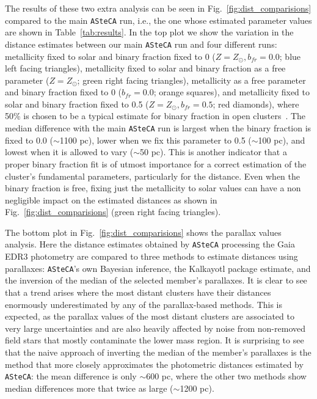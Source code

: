 \documentclass[draft]{aa}
\begin{document}
  The results of these two extra analysis can be seen in
  Fig.~\ref{fig:dist_comparisions} compared to the main \texttt{ASteCA} run,
  i.e., the one whose estimated parameter values are shown in
  Table~\ref{tab:results}.
  In the top plot we show the variation in the distance estimates between our
  main \texttt{ASteCA} run and four different runs: metallicity fixed to solar
  and binary fraction fixed to 0 ($Z=Z_{\odot},b_{fr}=0.0$; blue left
  facing triangles), metallicity fixed to solar and binary fraction as a free
  parameter ($Z=Z_{\odot}$; green right facing triangles), metallicity
  as a free parameter and binary fraction fixed to 0 ($b_{fr}=0.0$; orange
  squares), and metallicity fixed to solar and binary fraction fixed to
  0.5 ($Z=Z_{\odot},b_{fr}=0.5$; red diamonds), where 50\% is
  chosen to be a typical estimate for binary fraction in open
  clusters~\citep{vonHippel_2005}.
  The median difference with the main \texttt{ASteCA} run is largest when the
  binary fraction is fixed to 0.0 ($\sim$1100 pc), lower when we fix this
  parameter to 0.5 ($\sim$100 pc), and lowest when it is allowed to vary 
  ($\sim$50 pc). This is another indicator that a proper binary fraction fit is
  of utmost importance for a correct  estimation of the cluster's fundamental
  parameters, particularly for the distance. Even when the binary fraction is
  free, fixing just the metallicity to solar values can have a non
  negligible impact on the estimated distances as shown in
  Fig.~\ref{fig:dist_comparisions} (green right facing triangles).

  The bottom plot in Fig.~\ref{fig:dist_comparisions} shows the parallax values
  analysis. Here the distance estimates obtained by \texttt{ASteCA} processing
  the Gaia EDR3 photometry are compared to three methods to estimate distances
  using parallaxes: \texttt{ASteCA}'s own Bayesian inference, the Kalkayotl
  package estimate, and the inversion of the median of the selected member's
  parallaxes. It is clear to see that a trend arises where the most distant
  clusters have their distances enormously underestimated by any of the
  parallax-based methods. This is expected, as the parallax values of the most
  distant clusters are associated to very large uncertainties and are also
  heavily affected by noise from non-removed field stars that mostly contaminate
  the lower mass region.
  It is surprising to see that the naive approach of inverting the median of
  the member's parallaxes is the method that more closely approximates the
  photometric distances estimated by \texttt{ASteCA}: the mean difference is
  only $\sim$600 pc, where the other two methods show median differences more
  that twice as large ($\sim$1200 pc).
  \\
\end{document}

